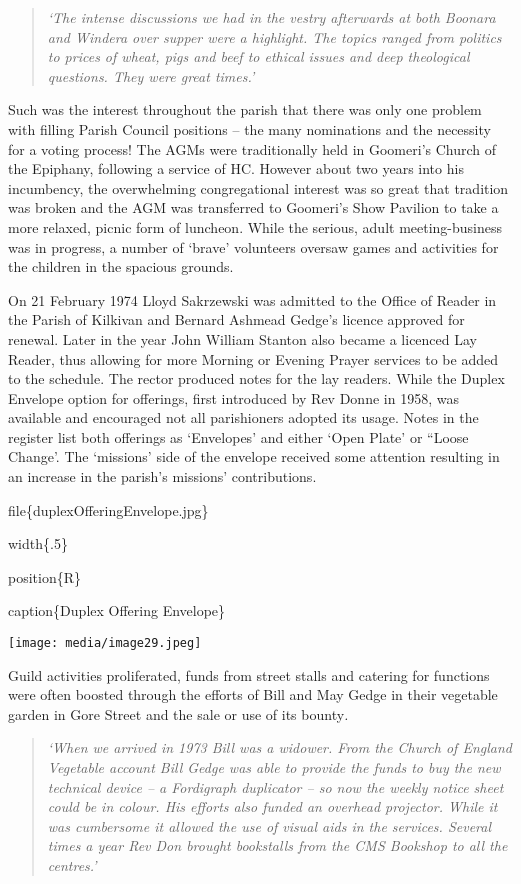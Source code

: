\begin{quote}
\emph{`The intense discussions we had in the vestry afterwards at both
Boonara and Windera over supper were a highlight. The topics ranged from
politics to prices of wheat, pigs and beef to ethical issues and deep
theological questions. They were great times.'}
\end{quote}

Such was the interest throughout the parish that there was only one
problem with filling Parish Council positions -- the many nominations
and the necessity for a voting process! The AGMs were traditionally held
in Goomeri's Church of the Epiphany, following a service of HC. However
about two years into his incumbency, the overwhelming congregational
interest was so great that tradition was broken and the AGM was
transferred to Goomeri's Show Pavilion to take a more relaxed, picnic
form of luncheon. While the serious, adult meeting-business was in
progress, a number of `brave' volunteers oversaw games and activities
for the children in the spacious grounds.

On 21 February 1974 Lloyd Sakrzewski was admitted to the Office of
Reader in the Parish of Kilkivan and Bernard Ashmead Gedge's licence
approved for renewal. Later in the year John William Stanton also became
a licenced Lay Reader, thus allowing for more Morning or Evening Prayer
services to be added to the schedule. The rector produced notes for the
lay readers. While the Duplex Envelope option for offerings, first
introduced by Rev Donne in 1958, was available and encouraged not all
parishioners adopted its usage. Notes in the register list both
offerings as `Envelopes' and either `Open Plate' or ``Loose Change'. The
`missions' side of the envelope received some attention resulting in an
increase in the parish's missions' contributions.

file\{duplexOfferingEnvelope.jpg\}

width\{.5\}

position\{R\}

caption\{Duplex Offering Envelope\}

\texttt{[image: media/image29.jpeg]}

Guild activities proliferated, funds from street stalls and catering for
functions were often boosted through the efforts of Bill and May Gedge
in their vegetable garden in Gore Street and the sale or use of its
bounty\emph{.}

\begin{quote}
\emph{`When we arrived in 1973 Bill was a widower. From the Church of
England Vegetable account Bill Gedge was able to provide the funds to
buy the new technical device -- a Fordigraph duplicator -- so now the
weekly notice sheet could be in colour. His efforts also funded an
overhead projector. While it was cumbersome it allowed the use of visual
aids in the services. Several times a year Rev Don brought bookstalls
from the CMS Bookshop to all the centres.'}
\end{quote}


